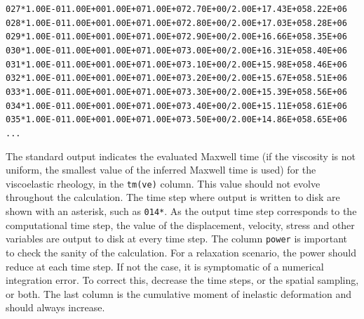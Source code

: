 \documentclass[10pt]{article}
\begin{document}
\begin{alltt}
027* 1.00E-01 1.00E+00 1.00E+07 1.00E+07 2.70E+00/2.00E+1 {\color{NavyBlue}7.43E+05 8.22E+06}
028* 1.00E-01 1.00E+00 1.00E+07 1.00E+07 2.80E+00/2.00E+1 {\color{NavyBlue}7.03E+05 8.28E+06}
029* 1.00E-01 1.00E+00 1.00E+07 1.00E+07 2.90E+00/2.00E+1 {\color{NavyBlue}6.66E+05 8.35E+06}
030* 1.00E-01 1.00E+00 1.00E+07 1.00E+07 3.00E+00/2.00E+1 {\color{NavyBlue}6.31E+05 8.40E+06}
031* 1.00E-01 1.00E+00 1.00E+07 1.00E+07 3.10E+00/2.00E+1 {\color{NavyBlue}5.98E+05 8.46E+06}
032* 1.00E-01 1.00E+00 1.00E+07 1.00E+07 3.20E+00/2.00E+1 {\color{NavyBlue}5.67E+05 8.51E+06}
033* 1.00E-01 1.00E+00 1.00E+07 1.00E+07 3.30E+00/2.00E+1 {\color{NavyBlue}5.39E+05 8.56E+06}
034* 1.00E-01 1.00E+00 1.00E+07 1.00E+07 3.40E+00/2.00E+1 {\color{NavyBlue}5.11E+05 8.61E+06}
035* 1.00E-01 1.00E+00 1.00E+07 1.00E+07 3.50E+00/2.00E+1 {\color{NavyBlue}4.86E+05 8.65E+06}
...
\end{alltt}
The standard output indicates the evaluated Maxwell time (if the viscosity is not uniform, the smallest value of the inferred Maxwell time is used) for the viscoelastic rheology, in the \verb'tm(ve)' column. This value should not evolve throughout the calculation. The time step where output is written to disk are shown with an asterisk, such as \verb'014*'. As the output time step corresponds to the computational time step, the value of the displacement, velocity, stress and other variables are output to disk at every time step. The column \verb'power' is important to check the sanity of the calculation. For a relaxation scenario, the power should reduce at each time step. If not the case, it is symptomatic of a numerical integration error. To correct this, decrease the time steps, or the spatial sampling, or both. The last column is the cumulative moment of inelastic deformation and should always increase.
\end{document}
